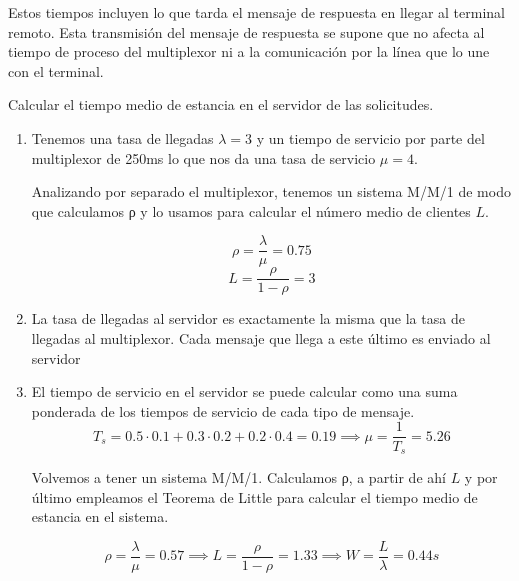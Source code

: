 \begin{problem}[8]
\begin{enumerate}
Estos tiempos incluyen lo que tarda el mensaje de respuesta en llegar al terminal remoto. Esta transmisión del mensaje de respuesta se supone que no afecta al tiempo de proceso del multiplexor ni a la comunicación por la línea que lo une con el terminal.

Calcular el tiempo medio de estancia en el servidor de las solicitudes.


\end{enumerate}

\solution

\yoP


\begin{enumerate}

\item

Tenemos una tasa de llegadas $λ=3$ y un tiempo de servicio por parte del multiplexor de 250ms lo que nos da una tasa de servicio $μ=4$.

Analizando por separado el multiplexor, tenemos un sistema M/M/1 de modo que calculamos ρ y lo usamos para calcular el número medio de clientes $L$.

\[ρ=\frac{λ}{μ}=0.75\]
\[L=\frac{ρ}{1-ρ}=3\]

\item

La tasa de llegadas al servidor es exactamente la misma que la tasa de llegadas al multiplexor. Cada mensaje que llega a este último es enviado al servidor

\item

El tiempo de servicio en el servidor se puede calcular como una suma ponderada de los tiempos de servicio de cada tipo de mensaje.
\[T_s = 0.5\cdot 0.1+0.3\cdot 0.2+0.2\cdot 0.4=0.19 \implies μ = \frac{1}{T_s}=5.26\]

Volvemos a tener un sistema M/M/1. Calculamos ρ, a partir de ahí $L$ y por último empleamos el Teorema de Little para calcular el tiempo medio de estancia en el sistema.

\[ρ = \frac{λ}{μ}=0.57 \implies L=\frac{ρ}{1-ρ}=1.33 \implies W = \frac{L}{λ}=0.44 s\]
\end{enumerate}

\newpage
\end{problem}


